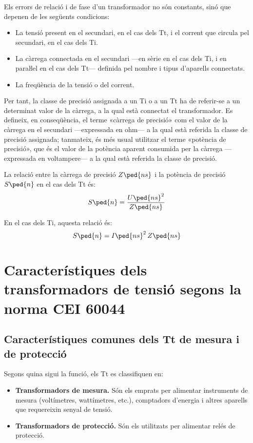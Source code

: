 Els errors de relació i de fase d'un transformador no són
constants, sinó que depenen de les següents condicions:
\begin{itemize}
   \item La tensió present en el secundari, en el cas dels Tt, i el corrent que
   circula    pel secundari, en el cas dels Ti.
   \item La càrrega connectada en el secundari ---en sèrie en el cas dels Ti,
   i en paraŀlel en el cas dels Tt--- definida pel nombre i tipus d'aparells connectats.
   \item La freqüència de la tensió o del corrent.
\end{itemize}

Per tant, la classe de precisió assignada a un Ti o a un Tt ha de
referir-se a un determinat valor de la càrrega, a la qual està
connectat el transformador. Es defineix, en conseqüència, el terme
«càrrega de precisió» com el valor de la càrrega en el secundari
---expressada en ohm--- a la qual està referida la classe de precisió
assignada; tanmateix, és més usual  utilitzar el terme «potència
de precisió», que és el valor de la potència aparent consumida per la càrrega ---expressada  en voltampere---
 a la qual està referida la classe de precisió.

La relació entre la càrrega de precisió $Z\ped{ns}$ i la potència de
precisió $S\ped{n}$ en el cas dels Tt és:
\begin{equation}
    S\ped{n} = \frac{U\ped{ns}^2}{Z\ped{ns}}
\end{equation}

En el cas dels Ti, aquesta relació és:
\begin{equation}\label{eq:sn_ti}
    S\ped{n} = I\ped{ns}^2 \,Z\ped{ns}
\end{equation}


\section{Característiques dels transformadors de tensió segons la norma CEI 60044}

\subsection{Característiques comunes dels Tt de mesura i de protecció}

Segons quina sigui la  funció, els Tt es classifiquen en:
\begin{itemize}
	\item \textbf{Transformadors de mesura.} Són els emprats per alimentar
	instruments de mesura (voltímetres, wattímetres, etc.),         comptadors d'energia i altres aparells que requereixin senyal de tensió.
	\item \textbf{Transformadors de protecció.}  Són els utilitzats per
	alimentar relés de protecció.
\end{itemize}

